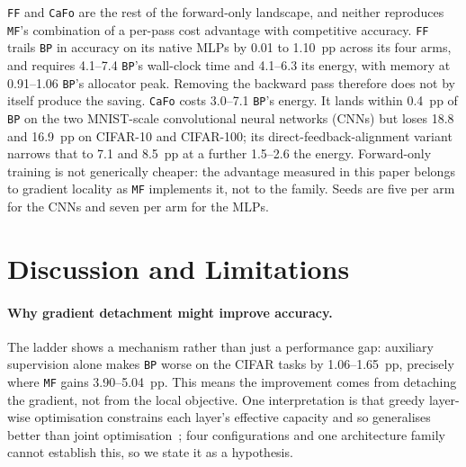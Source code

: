 \documentclass{llncs}
\newcommand{\FF}{\texttt{FF}}
\newcommand{\MF}{\texttt{MF}}
\newcommand{\BP}{\texttt{BP}}
\newcommand{\CaFo}{\texttt{CaFo}}
\begin{document}
\FF{} and \CaFo{} are the rest of the forward-only landscape, and neither
reproduces \MF{}'s combination of a per-pass cost advantage with competitive
accuracy. \FF{} trails \BP{} in accuracy on its native MLPs by
\num{0.01} to \num{1.10}~pp across its four arms, and requires
\SIrange{4.1}{7.4}{\times} \BP{}'s wall-clock time and
\SIrange{4.1}{6.3}{\times} its energy, with memory at \SIrange{0.91}{1.06}{\times} \BP{}'s
allocator peak. Removing the backward pass therefore does not by itself
produce the saving.
\CaFo{} costs \SIrange{3.0}{7.1}{\times} \BP{}'s energy. It lands within
\num{0.4}~pp of \BP{} on the two MNIST-scale convolutional neural networks (CNNs) but loses \num{18.8} and
\num{16.9}~pp on CIFAR-10 and CIFAR-100; its direct-feedback-alignment variant
narrows that to \num{7.1} and \num{8.5}~pp at a further
\SIrange{1.5}{2.6}{\times} the energy. Forward-only training is not
generically cheaper: the advantage measured in this paper belongs to
gradient locality as \MF{} implements it, not to the family.
Seeds are five per arm for the CNNs and seven per arm for the MLPs.


\section{Discussion and Limitations}
\label{sec:discussion}

\paragraph{Why gradient detachment might improve accuracy.}
The ladder shows a mechanism rather than just a performance gap: auxiliary
supervision alone makes \BP{} worse on the CIFAR tasks by
\num{1.06}--\num{1.65}~pp, precisely where \MF{} gains
\num{3.90}--\num{5.04}~pp. This means the improvement comes from detaching the
gradient, not from the local objective. One
interpretation is that greedy layer-wise optimisation constrains each layer's
effective capacity and so generalises better than joint
optimisation~\cite{ren2023scaling,ishikawa2025local}; four configurations and
one architecture family cannot establish this, so we state it as a hypothesis.
\end{document}
